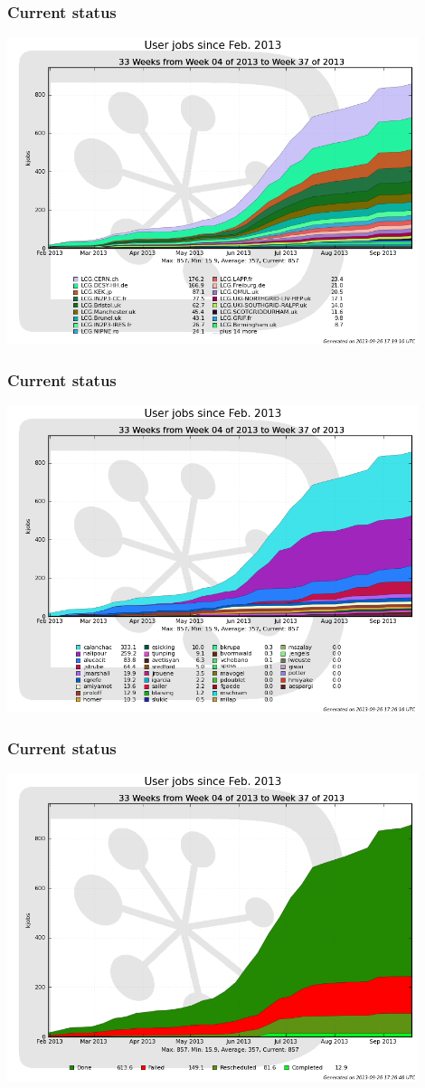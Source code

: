 \documentclass[10pt,table,dvipsnames]{beamer}
\begin{document}
\begin{frame}
\frametitle{Current status}
\centering
\includegraphics[width=0.9\textwidth]{userjobs}
\end{frame}
\begin{frame}
\frametitle{Current status}
\centering
\includegraphics[width=0.9\textwidth]{userjobsperuser}
\end{frame}
\begin{frame}
\frametitle{Current status}
\centering
\includegraphics[width=0.9\textwidth]{userjobsperstatus}
\end{frame}
\end{document}
